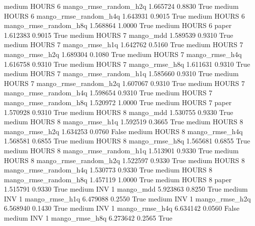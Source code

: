     medium    HOURS                 6 mango_rmse_random_h2q   1.665724      0.8830    True
    medium    HOURS                 6 mango_rmse_random_h4q   1.643931      0.9015    True
    medium    HOURS                 6 mango_rmse_random_h8q   1.568864      1.0000    True
    medium    HOURS                 6                 paper   1.612383      0.9015    True
    medium    HOURS                 7             mango_mdd   1.589539      0.9310    True
    medium    HOURS                 7        mango_rmse_h1q   1.642762      0.5160    True
    medium    HOURS                 7        mango_rmse_h2q   1.689304      0.1080    True
    medium    HOURS                 7        mango_rmse_h4q   1.616758      0.9310    True
    medium    HOURS                 7        mango_rmse_h8q   1.611631      0.9310    True
    medium    HOURS                 7 mango_rmse_random_h1q   1.585660      0.9310    True
    medium    HOURS                 7 mango_rmse_random_h2q   1.607067      0.9310    True
    medium    HOURS                 7 mango_rmse_random_h4q   1.598654      0.9310    True
    medium    HOURS                 7 mango_rmse_random_h8q   1.520972      1.0000    True
    medium    HOURS                 7                 paper   1.570928      0.9310    True
    medium    HOURS                 8             mango_mdd   1.530755      0.9330    True
    medium    HOURS                 8        mango_rmse_h1q   1.592519      0.3665    True
    medium    HOURS                 8        mango_rmse_h2q   1.634253      0.0760   False
    medium    HOURS                 8        mango_rmse_h4q   1.568581      0.6855    True
    medium    HOURS                 8        mango_rmse_h8q   1.565681      0.6855    True
    medium    HOURS                 8 mango_rmse_random_h1q   1.513901      0.9330    True
    medium    HOURS                 8 mango_rmse_random_h2q   1.522597      0.9330    True
    medium    HOURS                 8 mango_rmse_random_h4q   1.530773      0.9330    True
    medium    HOURS                 8 mango_rmse_random_h8q   1.457119      1.0000    True
    medium    HOURS                 8                 paper   1.515791      0.9330    True
    medium      INV                 1             mango_mdd   5.923863      0.8250    True
    medium      INV                 1        mango_rmse_h1q   6.479088      0.2550    True
    medium      INV                 1        mango_rmse_h2q   6.568940      0.1430    True
    medium      INV                 1        mango_rmse_h4q   6.634142      0.0560   False
    medium      INV                 1        mango_rmse_h8q   6.273642      0.2565    True
